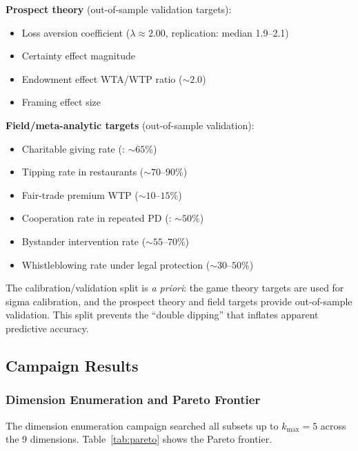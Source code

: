 \documentclass[12pt]{article}
\begin{document}
\textbf{Prospect theory} (out-of-sample validation targets):
\begin{itemize}
    \item Loss aversion coefficient ($\lambda \approx 2.00$, \cite{ruggeri2020} replication: median 1.9--2.1)
    \item Certainty effect magnitude
    \item Endowment effect WTA/WTP ratio ($\sim 2.0$)
    \item Framing effect size
\end{itemize}

\textbf{Field/meta-analytic targets} (out-of-sample validation):
\begin{itemize}
    \item Charitable giving rate (\cite{fraser2020}: $\sim 65\%$)
    \item Tipping rate in restaurants ($\sim 70\text{--}90\%$)
    \item Fair-trade premium WTP ($\sim 10\text{--}15\%$)
    \item Cooperation rate in repeated PD (\cite{camerer2003}: $\sim 50\%$)
    \item Bystander intervention rate ($\sim 55\text{--}70\%$)
    \item Whistleblowing rate under legal protection ($\sim 30\text{--}50\%$)
\end{itemize}

The calibration/validation split is \emph{a priori}: the game theory targets are used for sigma calibration, and the prospect theory and field targets provide out-of-sample validation.  This split prevents the ``double dipping'' that inflates apparent predictive accuracy.

\subsection{Campaign Results}

\subsubsection{Dimension Enumeration and Pareto Frontier}

The dimension enumeration campaign searched all subsets up to $k_{\max} = 5$ across the 9 dimensions.  Table~\ref{tab:pareto} shows the Pareto frontier.
\end{document}
